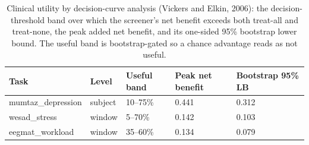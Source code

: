 \begin{table}[t]
\centering
\caption{Clinical utility by decision-curve analysis (Vickers and Elkin, 2006): the decision-threshold band over which the screener's net benefit exceeds both treat-all and treat-none, the peak added net benefit, and its one-sided 95\% bootstrap lower bound. The useful band is bootstrap-gated so a chance advantage reads as not useful.}
\label{tab:utility}
\begin{tabular}{lllll}
\toprule
Task & Level & Useful band & Peak net benefit & Bootstrap 95\% LB \\
\midrule
mumtaz\_depression & subject & 10--75\% & 0.441 & 0.312 \\
wesad\_stress & window & 5--70\% & 0.142 & 0.103 \\
eegmat\_workload & window & 35--60\% & 0.134 & 0.079 \\
\bottomrule
\end{tabular}
\end{table}
